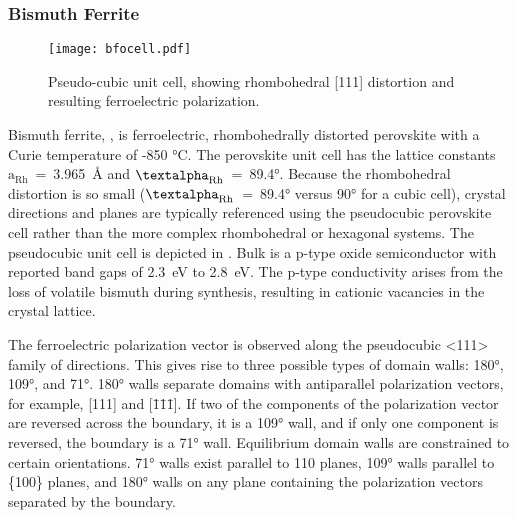 \subsubsection{Bismuth Ferrite}
\label{subsubsec:background.bfo}

\begin{figure}
\begin{center}
\texttt{[image: bfocell.pdf]}
\caption[Pseudo-cubic  unit cell]{%
	Pseudo-cubic  unit cell, showing rhombohedral [111] 
	distortion and resulting ferroelectric polarization.\cite{Catalan:2009ca}}
\label{fig:bfocell}
\end{center}
\end{figure}

Bismuth ferrite, , is ferroelectric, rhombohedrally distorted perovskite with a Curie temperature of -850 \si{\degreeCelsius}.\cite{Kornev:2007jr,Catalan:2009ca,Anonymous:htMDB4Eh,Miao:2008fz} The perovskite unit cell has the lattice constants $\text{a}_{\text{Rh}}$~=~3.965~\si{\angstrom} and $\text{\textalpha}_{\text{Rh}}$~=~89.4\si{\degree}.\cite{Kubel:1990kd} Because the rhombohedral distortion is so small ($\text{\textalpha}_{\text{Rh}}$~=~89.4\si{\degree} versus 90\si{\degree} for a cubic cell), crystal directions and planes are typically referenced using the pseudocubic perovskite cell rather than the more complex rhombohedral or hexagonal systems.  The pseudocubic unit cell is depicted in . Bulk  is a p-type oxide semiconductor with reported band gaps of 2.3~eV to 2.8~eV.\cite{Ihlefeld:2008hl,Clark:2007bt,Kumar:2008fr} The p-type conductivity arises from the loss of volatile bismuth during synthesis, resulting in cationic vacancies in the crystal lattice. 

The ferroelectric polarization vector is observed along the pseudocubic <111> family of directions.\cite{Catalan:2009ca} This gives rise to three possible types of domain walls: 180\si{\degree}, 109\si{\degree}, and 71\si{\degree}. 180\si{\degree} walls separate domains with antiparallel polarization vectors, for example, [111] and [\={1}\={1}\={1}]. If two of the components of the polarization vector are reversed across the boundary, it is a 109\si{\degree} wall, and if only one component is reversed, the boundary is a 71\si{\degree} wall. Equilibrium domain walls are constrained to certain orientations. 71\si{\degree} walls exist parallel to {110} planes, 109\si{\degree} walls parallel to \{100\} planes, and 180\si{\degree} walls on any plane containing the polarization vectors separated by the boundary.\cite{Streiffer:1998vt}

